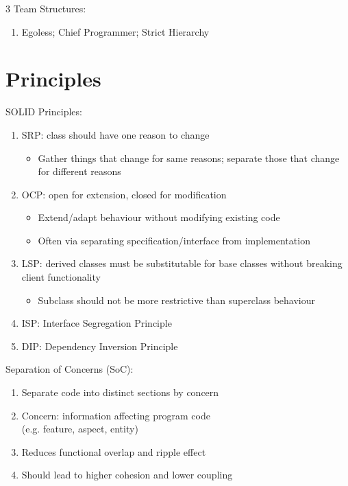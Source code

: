 \documentclass[12pt, a4paper]{article}
\begin{document}
\begin{multicols*}{3}
Team Structures:
\begin{enumerate}[\roman*.]
  \item Egoless; Chief Programmer; Strict Hierarchy
\end{enumerate}
\vspace{-1em}
\colbreak
\section{Principles}
SOLID Principles:
\begin{enumerate}[\roman*.]
  \item SRP: class should have one reason to change
    \begin{itemize}[leftmargin=*]\vspace{3pt}
      \item Gather things that change for same reasons; separate those that change for different reasons
    \end{itemize}
  \item OCP: open for extension, closed for modification
    \begin{itemize}[leftmargin=*]\vspace{3pt}
      \item Extend/adapt behaviour without modifying existing code
      \item Often via separating specification/interface from implementation
    \end{itemize}
  \item LSP: derived classes must be substitutable for base classes without breaking client functionality
    \begin{itemize}[leftmargin=*]\vspace{3pt}
      \item Subclass should not be more restrictive than superclass behaviour
    \end{itemize}
  \item ISP: Interface Segregation Principle
  \item DIP: Dependency Inversion Principle
\end{enumerate}

Separation of Concerns (SoC):
\begin{enumerate}[\roman*.]
  \item Separate code into distinct sections by concern
  \item Concern: information affecting program code\\(e.g. feature, aspect, entity)
  \item Reduces functional overlap and ripple effect
  \item Should lead to higher cohesion and lower coupling
\end{enumerate}


\end{multicols*}
\end{document}
